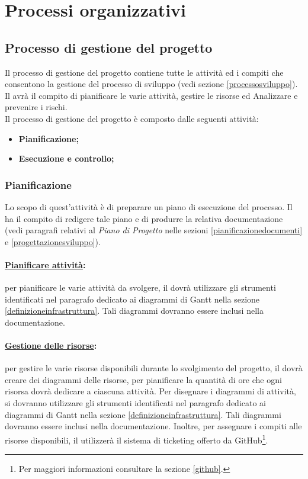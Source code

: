 \section{Processi organizzativi}
\label{processiorganizzativi}

\subsection{Processo di gestione del progetto}
\label{gestioneprogetto}
Il processo di gestione del progetto contiene tutte le attività ed i compiti che consentono la gestione del processo di sviluppo (vedi sezione \ref{processosviluppo}). Il \projectManager{} avrà il compito di pianificare le varie attività, gestire le risorse ed Analizzare e prevenire i rischi.\\
Il processo di gestione del progetto è composto dalle seguenti attività:
\begin{itemize}
\item \textbf{Pianificazione;}
\item \textbf{Esecuzione e controllo;}
\end{itemize}

\subsubsection{Pianificazione}
\label{pianificazione}
Lo scopo di quest'attività è di preparare un piano di esecuzione del processo. Il \projectManager{} ha il compito di redigere tale piano e di produrre la relativa documentazione (vedi paragrafi relativi al \textit{Piano di Progetto} nelle sezioni \ref{pianificazionedocumenti} e \ref{progettazionesviluppo}).

\paragraph{\underline{Pianificare attività}:} per pianificare le varie attività da svolgere, il \projectManager{} dovrà utilizzare gli strumenti identificati nel paragrafo dedicato ai diagrammi di Gantt\g{} nella sezione \ref{definizioneinfrastruttura}. Tali diagrammi dovranno essere inclusi nella documentazione.

\paragraph{\underline{Gestione delle risorse}:} per gestire le varie risorse disponibili durante lo svolgimento del progetto, il \projectManager{} dovrà creare dei diagrammi delle risorse, per pianificare la quantità di ore che ogni risorsa dovrà dedicare a ciascuna attività. Per disegnare i diagrammi di attività, si dovranno utilizzare gli strumenti identificati nel paragrafo dedicato ai diagrammi di Gantt\g{} nella sezione \ref{definizioneinfrastruttura}. Tali diagrammi dovranno essere inclusi nella documentazione.
Inoltre, per assegnare i compiti alle risorse disponibili, il \projectManager{} utilizzerà il sistema di ticketing offerto da GitHub\g{}\footnote{Per maggiori informazioni consultare la sezione \ref{github}.}.

